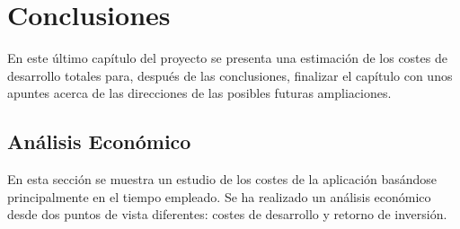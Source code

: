 \chapter[Conclusiones]{
  \label{chp:conclusiones}
  Conclusiones
}
\minitoc
\newpage

En este último capítulo del proyecto se presenta una estimación de los costes
de desarrollo totales para, después de las conclusiones, finalizar el capítulo
con unos apuntes acerca de las direcciones de las posibles futuras ampliaciones.


\section{Análisis Económico}

En esta sección se muestra un estudio de los costes de la aplicación basándose
principalmente en el tiempo empleado. Se ha realizado un análisis económico
desde  dos puntos de vista diferentes: costes de desarrollo y retorno de inversión.
